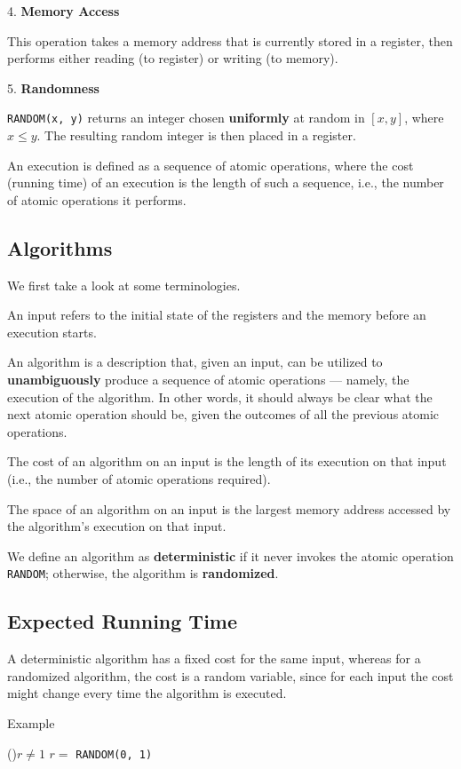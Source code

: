 4. \textbf{Memory Access}

This operation takes a memory address that is currently stored in a register, then performs either reading (to register) or writing (to memory). 

5. \textbf{Randomness} 

\texttt{RANDOM(x, y)} returns an integer chosen \textbf{uniformly} at random in \([x, y]\), where \(x \leq y\). The resulting random integer is then placed in a register.

An execution is defined as a sequence of atomic operations, where the cost (running time) of an execution is the length of such a sequence, i.e., the number of atomic operations it performs.

\subsection{Algorithms}
We first take a look at some terminologies. 

An input refers to the initial state of the registers and the memory before an execution starts.

An algorithm is a description that, given an input, can be utilized to \textbf{unambiguously} produce a sequence of atomic operations — namely, the execution of the algorithm. In other words, it should always be clear what the next atomic operation should be, given the outcomes of all the previous atomic operations.

The cost of an algorithm on an input is the length of its execution on that input (i.e., the number of atomic operations required).

The space of an algorithm on an input is the largest memory address accessed by the algorithm’s execution on that input.

We define an algorithm as \textbf{deterministic} if it never invokes the atomic operation \texttt{RANDOM}; otherwise, the algorithm is \textbf{randomized}. 

\subsection{Expected Running Time}
A deterministic algorithm has a fixed cost for the same input, whereas for a randomized algorithm, the cost is a random variable, since for each input the cost might change every time the algorithm is executed. 

\begin{algorithm}[H]
	\DontPrintSemicolon{}
	\caption{Example}
	\BlankLine
	\While(){\(r \neq 1\)}{
		\(r = \) \texttt{RANDOM(0, 1)}
	}
	\;
\end{algorithm}

